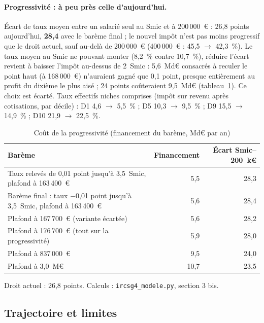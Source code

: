 \paragraph{Progressivité : à peu près celle d'aujourd'hui.} Écart de taux moyen entre un salarié seul au Smic et à 200\,000~€ : 26,8 points aujourd'hui, \textbf{28,4} avec le barème final ; le nouvel impôt n'est pas moins progressif que le droit actuel, sauf au-delà de 200\,000~€ (400\,000~€ : 45,5 $\to$ 42,3~\%). Le taux moyen au Smic ne pouvant monter (8,2~\% contre 10,7~\%), réduire l'écart revient à baisser l'impôt au-dessus de 2~Smic : 5,6~Md€ consacrés à reculer le point haut (à 168\,000~€) n'auraient gagné que 0,1 point, presque entièrement au profit du dixième le plus aisé ; 24 points coûteraient 9,5~Md€ (tableau~\ref{tab:ircsg4_prog}). Ce choix est écarté. Taux effectifs niches comprises (impôt sur revenu après cotisations, par décile) : D1 4,6 $\to$ 5,5~\% ; D5 10,3 $\to$ 9,5~\% ; D9 15,5 $\to$ 14,9~\% ; D10 21,9 $\to$ 22,5~\%.

\begin{table}[h]\centering\footnotesize
\caption{Coût de la progressivité (financement du barème, Md€ par an)}\label{tab:ircsg4_prog}
\begin{tabular}{lrr}\hline
Barème & Financement & Écart Smic--200~k€ \\ \hline
Taux relevés de 0,01 point jusqu'à 3,5~Smic, plafond à 163\,400~€ & 5{,}5 & 28{,}3 \\
Barème final : taux $-$0,01 point jusqu'à 3,5~Smic, plafond à 163\,400~€ & 5{,}6 & 28{,}4 \\
Plafond à 167\,700~€ (variante écartée) & 5{,}6 & 28{,}2 \\
Plafond à 176\,700~€ (tout sur la progressivité) & 5{,}9 & 28{,}0 \\
Plafond à 837\,000~€ & 9{,}5 & 24{,}0 \\
Plafond à 3,0~M€ & 10{,}7 & 23{,}5 \\ \hline
\end{tabular}
\par\footnotesize Droit actuel : 26,8 points. Calculs : \texttt{ircsg4\_modele.py}, section 3 bis.
\end{table}

\subsection{Trajectoire et limites}

